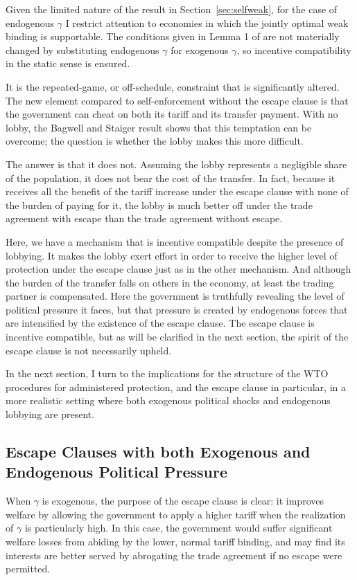 \documentclass[12pt]{article}
\newcommand{\ga}{\gamma}
\begin{document}
Given the limited nature of the result in Section~\ref{sec:selfweak}, for the case of endogenous $\ga$ I restrict attention to economies in which the jointly optimal weak binding is supportable. The conditions given in Lemma 1 of \Textcite{bs2005} are not materially changed by substituting endogenous $\ga$ for exogenous $\ga$, so incentive compatibility in the static sense is ensured.

It is the repeated-game, or off-schedule, constraint that is significantly altered. The new element compared to self-enforcement without the escape clause is that the government can cheat on both its tariff and its transfer payment. With no lobby, the Bagwell and Staiger result shows that this temptation can be overcome; the question is whether the lobby makes this more difficult.

The answer is that it does not. Assuming the lobby represents a negligible share of the population, it does not bear the cost of the transfer. In fact, because it receives all the benefit of the tariff increase under the escape clause with none of the burden of paying for it, the lobby is much better off under the trade agreement with escape than the trade agreement without escape.


Here, we have a mechanism that is incentive compatible despite the presence of lobbying. It makes the lobby exert effort in order to receive the higher level of protection under the escape clause just as in the other mechanism. And although the burden of the transfer falls on others in the economy, at least the trading partner is compensated. Here the government is truthfully revealing the level of political pressure it faces, but that pressure is created by endogenous forces that are intensified by the existence of the escape clause. The escape clause is incentive compatible, but as will be clarified in the next section, the spirit of the escape clause is not necessarily upheld.

In the next section, I turn to the implications for the structure of the WTO procedures for administered protection, and the escape clause in particular, in a more realistic setting where both exogenous political shocks and endogenous lobbying are present.


\subsection{Escape Clauses with both Exogenous and Endogenous Political Pressure}
\label{sec:escape2}
When $\ga$ is exogenous, the purpose of the escape clause is clear: it improves welfare by allowing the government to apply a higher tariff when the realization of $\ga$ is particularly high. In this case, the government would suffer significant welfare losses from abiding by the lower, normal tariff binding, and may find its interests are better served by abrogating the trade agreement if no escape were permitted.
\end{document}
